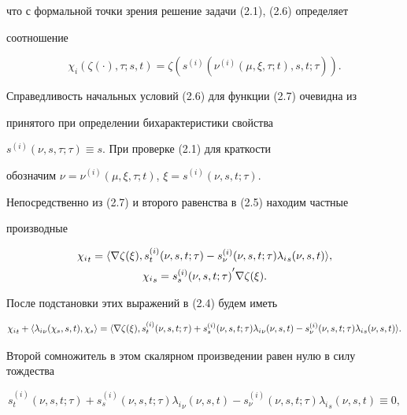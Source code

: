 что с формальной точки зрения решение задачи (2.1), (2.6) определяет 


соотношение


\begin{equation}


{\chi_i} (\zeta(\cdot),\tau;s,t)=


\zeta(s^{(i)} ( \nu^{(i)}(\mu,\xi,\tau;t),s,t; \tau)).


\end{equation}





Справедливость начальных условий (2.6) для функции (2.7) очевидна из 


принятого при определении бихарактеристики свойства 


$s^{(i)}(\nu,s,\tau;\tau) \equiv s$. При проверке (2.1) для краткости 


обозначим $\nu=\nu^{(i)}(\mu,\xi,\tau;t)$, $\xi=s^{(i)}(\nu,s,t; \tau)$.


Непосредственно из (2.7) и второго равенства в (2.5) находим частные 


производные


\begin{gather*}


{\chi_i}_t=\la \nabla\zeta(\xi), s^{(i)}_t (\nu,s,t;\tau) -


s^{(i)}_\nu (\nu,s,t;\tau) {\lambda_i}_s (\nu,s,t) \ra, \\


{\chi_i}_s={s^{(i)}_s (\nu,s,t;\tau)}^{\prime} 


\nabla \zeta(\xi).


\end{gather*} 


После подстановки этих выражений в (2.4) будем иметь


$$


{\chi_i}_t+\la {\lambda_i}_\nu (\chi_s,s,t), \chi_s\ra=


\la \nabla\zeta(\xi), s^{(i)}_t (\nu,s,t;\tau)+


s^{(i)}_s (\nu,s,t;\tau) {\lambda_i}_\nu (\nu,s,t) -


s^{(i)}_\nu (\nu,s,t;\tau) {\lambda_i}_s (\nu,s,t) \ra.


$$


Второй сомножитель в этом скалярном произведении равен нулю в силу тождества


\begin{equation}


s^{(i)}_t (\nu,s,t;\tau)+s^{(i)}_s (\nu,s,t;\tau) {\lambda_i}_\nu (\nu,s,t) 


- s^{(i)}_\nu (\nu,s,t;\tau) {\lambda_i}_s (\nu,s,t) \equiv 0,


\end{equation}


